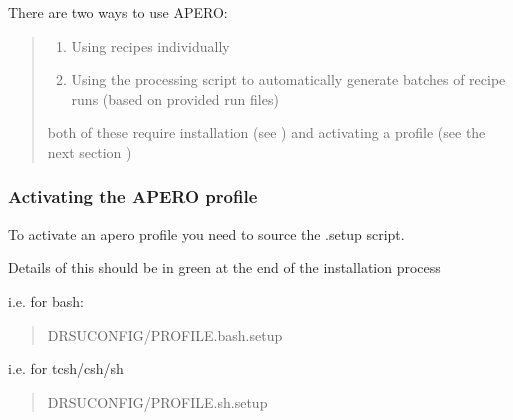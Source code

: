 \documentclass[a4paper,10pt,english]{report}
\begin{document}
There are two ways to use APERO:
\begin{quote}
\begin{enumerate}
%
\item {} 
Using recipes individually

\item {} 
Using the processing script to automatically generate batches of recipe
runs (based on provided run files)

\end{enumerate}

both of these require installation (see {\hyperref[\detokenize{user/general/installation:installation}]{}})
and activating a profile (see the next section {\hyperref[\detokenize{user/general/using_apero_default:activating-apero-profile}]{}})
\end{quote}


\subsubsection{Activating the APERO profile}
\label{\detokenize{user/general/using_apero_default:activating-the-apero-profile}}\label{\detokenize{user/general/using_apero_default:activating-apero-profile}}
To activate an apero profile you need to source the .setup script.

Details of this should be in green at the end of the installation process

i.e. for bash:
\begin{quote}

\begin{sphinxVerbatim}[commandchars=\\\{\}]
 DRS\PYGZus{}UCONFIG/PROFILE.bash.setup
\end{sphinxVerbatim}
\end{quote}

i.e. for tcsh/csh/sh
\begin{quote}

\begin{sphinxVerbatim}[commandchars=\\\{\}]
 DRS\PYGZus{}UCONFIG/PROFILE.sh.setup
\end{sphinxVerbatim}
\end{quote}
\end{document}
